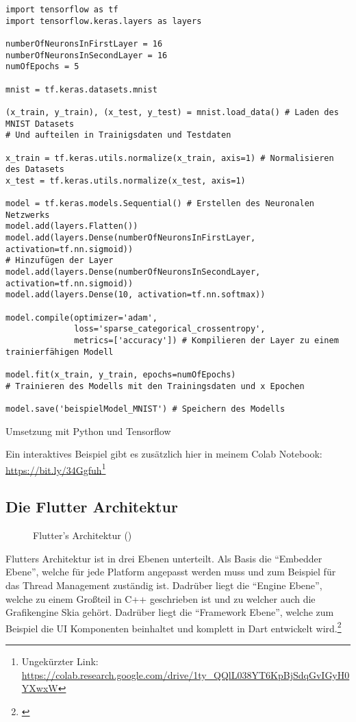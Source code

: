 \begin{listing}[H]
    \begin{verbatim}
import tensorflow as tf
import tensorflow.keras.layers as layers

numberOfNeuronsInFirstLayer = 16 
numberOfNeuronsInSecondLayer = 16 
numOfEpochs = 5 

mnist = tf.keras.datasets.mnist

(x_train, y_train), (x_test, y_test) = mnist.load_data() # Laden des MNIST Datasets
# Und aufteilen in Trainigsdaten und Testdaten

x_train = tf.keras.utils.normalize(x_train, axis=1) # Normalisieren des Datasets
x_test = tf.keras.utils.normalize(x_test, axis=1)

model = tf.keras.models.Sequential() # Erstellen des Neuronalen Netzwerks
model.add(layers.Flatten())
model.add(layers.Dense(numberOfNeuronsInFirstLayer, activation=tf.nn.sigmoid))
# Hinzufügen der Layer
model.add(layers.Dense(numberOfNeuronsInSecondLayer, activation=tf.nn.sigmoid))
model.add(layers.Dense(10, activation=tf.nn.softmax))

model.compile(optimizer='adam',
              loss='sparse_categorical_crossentropy',
              metrics=['accuracy']) # Kompilieren der Layer zu einem trainierfähigen Modell

model.fit(x_train, y_train, epochs=numOfEpochs)
# Trainieren des Modells mit den Trainingsdaten und x Epochen

model.save('beispielModel_MNIST') # Speichern des Modells

    \end{verbatim}
    \caption{Umsetzung mit Python und Tensorflow}
\end{listing}
Ein interaktives Beispiel gibt es zusätzlich hier in meinem Colab Notebook: \url{https://bit.ly/34Ggfuh}\footnote{Ungekürzter Link: \url{https://colab.research.google.com/drive/1ty_QQlL038YT6KpBjSdqGvIGyH0YXwxW}}

\subsection{Die Flutter Architektur}\label{anhang:flutterarc}

\begin{figure}[H]
    \centering
    \resizebox{\textwidth}{!}{
    
    }
    \caption{Flutter's Architektur (\cite{flutterarchitecture})}
\end{figure}

Flutters Architektur ist in drei Ebenen unterteilt. Als Basis die "`Embedder Ebene"', welche für jede Platform angepasst werden muss und zum Beispiel für das Thread Management zuständig ist. Dadrüber liegt die "`Engine Ebene"', welche zu einem Großteil in C++ geschrieben ist und zu welcher auch die Grafikengine Skia gehört. Dadrüber liegt die "`Framework Ebene"', welche zum Beispiel die UI Komponenten beinhaltet und komplett in Dart entwickelt wird.\footnote{\cite{flutterarchitecture}}